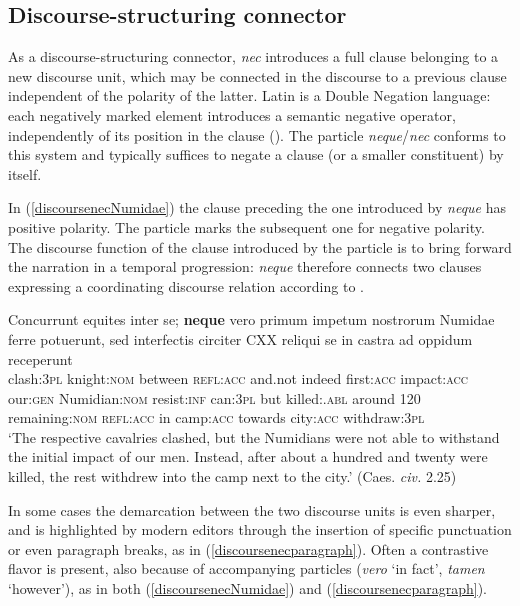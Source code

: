 \documentclass[output=paper]{langsci/langscibook}
\begin{document}
\subsection{Discourse-structuring connector}

As a discourse-structuring connector, {\emph{nec}} introduces a full clause belonging to a new discourse unit, which may be connected in the discourse to a previous clause independent of the polarity of the latter. Latin is a Double Negation language: each negatively marked element introduces a semantic negative operator, independently of its position in the clause (\citealt[]{Gianollo16}). The particle {\emph{neque}}\slash{\emph{nec}} conforms to this system and typically suffices to negate a clause (or a smaller constituent) by itself.

In (\ref{discoursenecNumidae}) the clause preceding the one introduced by {\emph{neque}} has positive polarity. The particle marks the subsequent one for negative polarity. The discourse function of the clause introduced by the particle is to bring forward the narration in a temporal progression: {\emph{neque}} therefore connects two clauses expressing a coordinating discourse relation according to \citet[]{Asher93}.

{\begin{exe}
\ex \label{discoursenecNumidae} \gll Concurrunt equites inter se; {\textbf{neque}} vero primum impetum nostrorum Numidae ferre potuerunt, sed interfectis circiter CXX reliqui se in castra ad oppidum receperunt\\
clash:{\textsc{3pl}} knight:{\textsc{nom}} between {\textsc{refl}}:{\textsc{acc}} and.not indeed first:{\textsc{acc}} impact:{\textsc{acc}} our:{\textsc{gen}} Numidian:{\textsc{nom}} resist:{\textsc{inf}} can:{\textsc{3pl}} but killed:{\ptcp}.{\textsc{abl}} around 120 remaining:{\textsc{nom}} {\textsc{refl}}:{\textsc{acc}} in camp:{\textsc{acc}} towards city:{\textsc{acc}} withdraw:{\textsc{3pl}}\\
\glt `The respective cavalries clashed, but the Numidians were not able to withstand the initial impact of our men. Instead, after about a hundred and twenty were killed, the rest withdrew into the camp next to the city.' (Caes. {\emph{civ.}} 2.25)
\end{exe}}

\noindent In some cases the demarcation between the two discourse units is even sharper, and is highlighted by modern editors through the insertion of specific punctuation or even paragraph breaks, as in (\ref{discoursenecparagraph}). Often a contrastive flavor is present, also because of accompanying particles ({\emph{vero}} `in fact', {\emph{tamen}} `however'), as in both (\ref{discoursenecNumidae}) and (\ref{discoursenecparagraph}).
\end{document}
